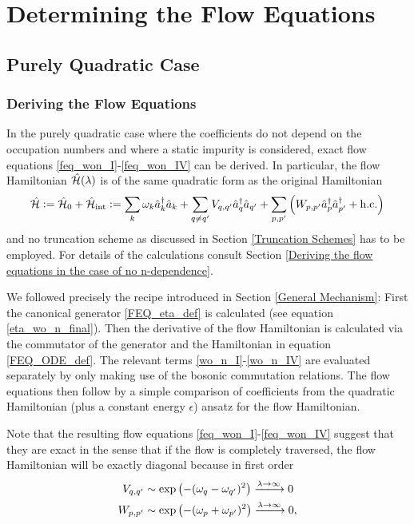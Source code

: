 \chapter{Determining the Flow Equations}\label{Determining the Flow Equations}
\section{Purely Quadratic Case}
\subsection{Deriving the Flow Equations}
In the purely quadratic case where the coefficients do not depend on the occupation numbers and where a static impurity is considered, exact flow equations \ref{feq_won_I}-\ref{feq_won_IV} can be derived. In particular, the flow Hamiltonian $\hat{\mathcal{H}}(\lambda)$ is of the same quadratic form as the original Hamiltonian
\begin{equation}\label{def_purely_quadratic_hamiltonian}
\hat{\mathcal{H}} \vcentcolon= \hat{\mathcal{H}}_0+\hat{\mathcal{H}}_{\mathrm{int}} \vcentcolon= \sum\limits_k \omega_k \hat a^\dagger_k\hat a_k+\sum\limits_{q\neq q^\prime}V_{q,q^\prime}\hat a^\dagger_q\hat a_{q^\prime}+\sum\limits_{p,p^\prime}\left(W_{p,p^\prime}\hat a^\dagger_p\hat a^\dagger_{p^\prime}+\mathrm{h.c.}\right)
\end{equation}
 and no truncation scheme as discussed in Section \ref{Truncation Schemes} has to be employed. For details of the calculations consult Section \ref{Deriving the flow equations in the case of no n-dependence}.\par 
We followed precisely the recipe introduced in Section \ref{General Mechanism}: First the canonical generator \ref{FEQ_eta_def} is calculated (see equation \ref{eta_wo_n_final}). Then the derivative of the flow Hamiltonian is calculated via the commutator of the generator and the Hamiltonian in equation \ref{FEQ_ODE_def}. The relevant terms \ref{wo_n_I}-\ref{wo_n_IV} are evaluated separately by only making use of the bosonic commutation relations. The flow equations then follow by a simple comparison of coefficients from the quadratic Hamiltonian (plus a constant energy $\epsilon$) ansatz for the flow Hamiltonian.\par
Note that the resulting flow equations \ref{feq_won_I}-\ref{feq_won_IV} suggest that they are exact in the sense that if the flow is completely traversed, the flow Hamiltonian will be exactly diagonal because in first order
\begin{subequations}
\begin{align}
V_{q,q^\prime}&\sim \exp\left(-(\omega_q-\omega_{q^\prime})^2\right)\xlongrightarrow{\lambda\rightarrow\infty}0\\
W_{p,p^\prime}&\sim \exp\left(-(\omega_p+\omega_{p^\prime})^2\right)\xlongrightarrow{\lambda\rightarrow\infty}0,
\end{align}
\end{subequations}
